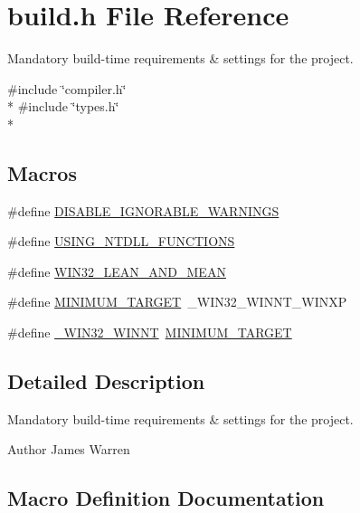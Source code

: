 \section{build.\-h File Reference}
\label{build_8h}


Mandatory build-\/time requirements \& settings for the project.  


{\ttfamily \#include \char`\"{}compiler.\-h\char`\"{}}\\*
{\ttfamily \#include \char`\"{}types.\-h\char`\"{}}\\*
\subsection*{Macros}
\begin{DoxyCompactItemize}
\item 
\#define \hyperlink{build_8h_ad2c5126c96c0ab7848935db389dca345}{D\-I\-S\-A\-B\-L\-E\-\_\-\-I\-G\-N\-O\-R\-A\-B\-L\-E\-\_\-\-W\-A\-R\-N\-I\-N\-G\-S}
\item 
\#define \hyperlink{build_8h_aa629308f4e18ecde3423ec692fe0eadc}{U\-S\-I\-N\-G\-\_\-\-N\-T\-D\-L\-L\-\_\-\-F\-U\-N\-C\-T\-I\-O\-N\-S}
\item 
\#define \hyperlink{build_8h_ac7bef5d85e3dcd73eef56ad39ffc84a9}{W\-I\-N32\-\_\-\-L\-E\-A\-N\-\_\-\-A\-N\-D\-\_\-\-M\-E\-A\-N}
\item 
\#define \hyperlink{build_8h_a65cd3615ddc670f8e929a0d6a2976ea4}{M\-I\-N\-I\-M\-U\-M\-\_\-\-T\-A\-R\-G\-E\-T}~\-\_\-\-W\-I\-N32\-\_\-\-W\-I\-N\-N\-T\-\_\-\-W\-I\-N\-X\-P
\item 
\#define \hyperlink{build_8h_ac50762666aa00bd3a4308158510f1748}{\-\_\-\-W\-I\-N32\-\_\-\-W\-I\-N\-N\-T}~\hyperlink{build_8h_a65cd3615ddc670f8e929a0d6a2976ea4}{M\-I\-N\-I\-M\-U\-M\-\_\-\-T\-A\-R\-G\-E\-T}
\end{DoxyCompactItemize}


\subsection{Detailed Description}
Mandatory build-\/time requirements \& settings for the project. \begin{DoxyAuthor}{Author}
James Warren 
\end{DoxyAuthor}


\subsection{Macro Definition Documentation}

